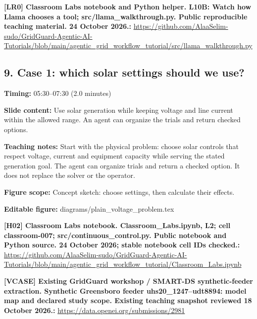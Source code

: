 \documentclass[10pt,letterpaper]{article}
\begin{document}
\textbf{[LR0] Classroom Labs notebook and Python helper. L10B: Watch how Llama chooses a tool; src/llama\_walkthrough.py. Public reproducible teaching material. 24 October 2026.:} \href{https://github.com/AlaaSelim-sudo/GridGuard-Agentic-AI-Tutorials/blob/main/agentic_grid_workflow_tutorial/src/llama_walkthrough.py}{\small\ttfamily https:/\allowbreak{}/\allowbreak{}github.\allowbreak{}com/\allowbreak{}AlaaSelim-\allowbreak{}sudo/\allowbreak{}GridGuard-\allowbreak{}Agentic-\allowbreak{}AI-\allowbreak{}Tutorials/\allowbreak{}blob/\allowbreak{}main/\allowbreak{}agentic\_\allowbreak{}grid\_\allowbreak{}workflow\_\allowbreak{}tutorial/\allowbreak{}src/\allowbreak{}llama\_\allowbreak{}walkthrough.\allowbreak{}py}\par
\par\medskip
\subsection*{9. Case 1: which solar settings should we use?}
\textbf{Timing:} 05:30--07:30 (2.0 minutes)\par
\textbf{Slide content:} Use solar generation while keeping voltage and line current within the allowed range.
An agent can organize the trials and return checked options.\par
\textbf{Teaching notes:} Start with the physical problem: choose solar controls that respect voltage, current and equipment capacity while serving the stated generation goal. The agent can organize trials and return a checked option. It does not replace the solver or the operator.\par
\textbf{Figure scope:} Concept sketch: choose settings, then calculate their effects.\par
\textbf{Editable figure:} diagrams/plain\_voltage\_problem.tex\par
\textbf{[H02] Classroom Labs notebook. Classroom\_Labs.ipynb, L2; cell classroom-007; src/continuous\_control.py. Public notebook and Python source. 24 October 2026; stable notebook cell IDs checked.:} \href{https://github.com/AlaaSelim-sudo/GridGuard-Agentic-AI-Tutorials/blob/main/agentic_grid_workflow_tutorial/Classroom_Labs.ipynb}{\small\ttfamily https:/\allowbreak{}/\allowbreak{}github.\allowbreak{}com/\allowbreak{}AlaaSelim-\allowbreak{}sudo/\allowbreak{}GridGuard-\allowbreak{}Agentic-\allowbreak{}AI-\allowbreak{}Tutorials/\allowbreak{}blob/\allowbreak{}main/\allowbreak{}agentic\_\allowbreak{}grid\_\allowbreak{}workflow\_\allowbreak{}tutorial/\allowbreak{}Classroom\_\allowbreak{}Labs.\allowbreak{}ipynb}\par
\textbf{[VCASE] Existing GridGuard workshop / SMART-DS synthetic-feeder extraction. Synthetic Greensboro feeder uhs20\_1247--udt8894: model map and declared study scope. Existing teaching snapshot reviewed 18 October 2026.:} \href{https://data.openei.org/submissions/2981}{\small\ttfamily https:/\allowbreak{}/\allowbreak{}data.\allowbreak{}openei.\allowbreak{}org/\allowbreak{}submissions/\allowbreak{}2981}\par
\par\medskip
\end{document}
